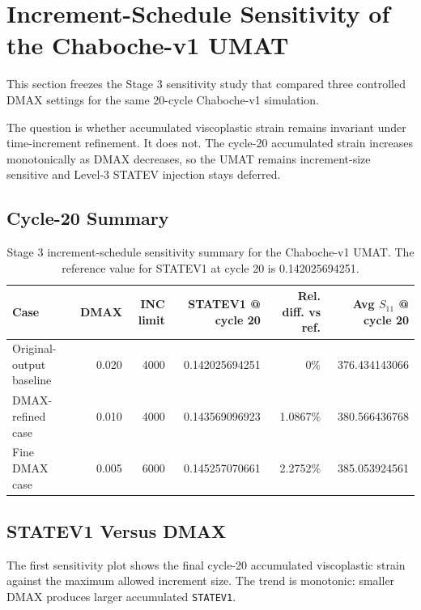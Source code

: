 \section{Increment-Schedule Sensitivity of the Chaboche-v1 UMAT}

This section freezes the Stage 3 sensitivity study that compared three controlled DMAX settings for the same 20-cycle Chaboche-v1 simulation.

The question is whether accumulated viscoplastic strain remains invariant under time-increment refinement. It does not. The cycle-20 accumulated strain increases monotonically as DMAX decreases, so the UMAT remains increment-size sensitive and Level-3 STATEV injection stays deferred.

\subsection{Cycle-20 Summary}

\begin{table}[htbp]
\centering
\small
\begin{tabular}{lrrrrr}
\toprule
\textbf{Case} & \textbf{DMAX} & \textbf{INC limit} & \textbf{STATEV1 @ cycle 20} & \textbf{Rel. diff. vs ref.} & \textbf{Avg $S_{11}$ @ cycle 20} \\
\midrule
Original-output baseline & 0.020 & 4000 & 0.142025694251 & 0\% & 376.434143066 \\
DMAX-refined case & 0.010 & 4000 & 0.143569096923 & 1.0867\% & 380.566436768 \\
Fine DMAX case & 0.005 & 6000 & 0.145257070661 & 2.2752\% & 385.053924561 \\
\bottomrule
\end{tabular}
\caption{Stage 3 increment-schedule sensitivity summary for the Chaboche-v1 UMAT. The reference value for STATEV1 at cycle 20 is 0.142025694251.}
\label{tab:stage3_increment_sensitivity}
\end{table}

\subsection{STATEV1 Versus DMAX}

The first sensitivity plot shows the final cycle-20 accumulated viscoplastic strain against the maximum allowed increment size. The trend is monotonic: smaller DMAX produces larger accumulated \texttt{STATEV1}.

